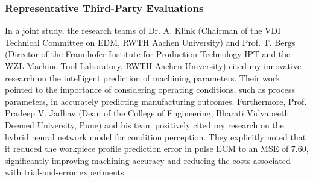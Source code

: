 \documentclass{ResearchStatement}
\begin{document}
\subsubsection{Representative Third-Party Evaluations}
In a joint study, the research teams of Dr. A. Klink (Chairman of the VDI Technical Committee on EDM, RWTH Aachen University) and Prof. T. Bergs (Director of the Fraunhofer Institute for Production Technology IPT and the WZL Machine Tool Laboratory, RWTH Aachen University) cited my innovative research on the intelligent prediction of machining parameters. Their work pointed to the importance of considering operating conditions, such as process parameters, in accurately predicting manufacturing outcomes. Furthermore, Prof. Pradeep V. Jadhav (Dean of the College of Engineering, Bharati Vidyapeeth Deemed University, Pune) and his team positively cited my research on the hybrid neural network model for condition perception. They explicitly noted that it reduced the workpiece profile prediction error in pulse ECM to an MSE of 7.60, significantly improving machining accuracy and reducing the costs associated with trial-and-error experiments.

\noindent\makebox[\textwidth][c]{%
    \centering
    
}
\begingroup
{}
\label{fig:citation_ai}
\endgroup



\end{document}

